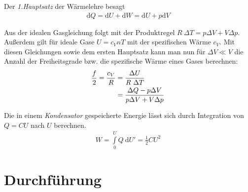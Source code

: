 \documentclass[12pt,a4paper,titlepage,headinclude,bibtotoc]{scrartcl}
\newcommand{\dif}{\ensuremath{\mathrm{d}}}
\begin{document}
Der \textit{1.Hauptsatz} der Wärmelehre besagt
\begin{align}
	\dif Q = \dif U+\dif W = \dif U+p\dif V \label{eq:1HS}
\end{align}

Aus der idealen Gasgleichung  folgt mit der Produktregel $R~\Delta T = p\Delta V+ V\Delta p$. Außerdem gilt für ideale Gase $U=c_VnT$ mit der spezifischen Wärme $c_V$.
Mit diesen Gleichungen sowie dem ersten Hauptsatz kann man nun für $\Delta V \ll V$ die Anzahl der Freiheitsgrade bzw. die spezifische Wärme eines Gases berechnen:
\begin{align}
\frac{f}{2}=\frac{c_V}{R}
          &=\frac{\Delta U}{R~\Delta T}\notag\\
          &=\frac{\Delta Q-p\Delta V}{p\Delta V+V\Delta p} \label{eq:fhalbe}
\end{align}


Die in einem \textit{Kondensator} gespeicherte Energie lässt sich  durch Integration von $Q=CU$ nach $U$ berechnen.
\begin{align}
	W=\int \limits_{0}^U Q ~\dif U'=\frac{1}{2}CU^2
	\label{eq:Kondensator}
\end{align}

\section{Durchführung}
\label{sec:durchfuehrung}
\end{document}
